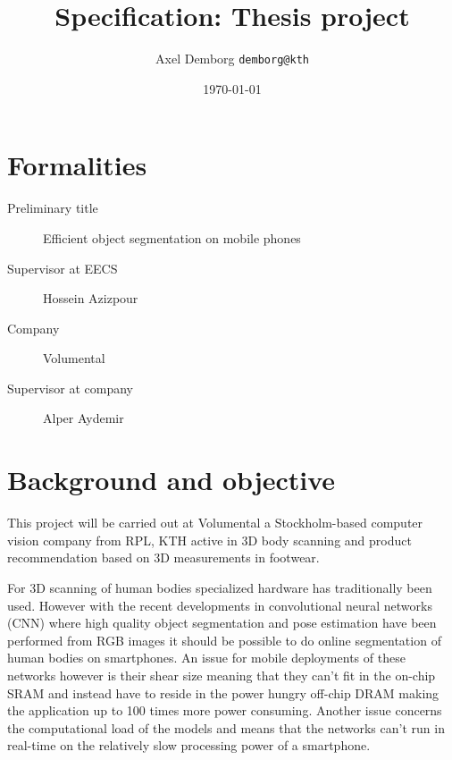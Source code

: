 \documentclass[11pt]{article}
\author{Axel Demborg \texttt{demborg@kth}}
\date{\today}
\title{Specification: Thesis project}
\newcommand{\bibentry}[1]{\cite{#1}}
\begin{document}
\maketitle

\section{Formalities}
\label{sec:orgdc45faf}
\begin{description}
\item[{Preliminary title}] Efficient object segmentation on mobile phones
\item[{Supervisor at EECS}] Hossein Azizpour
\item[{Company}] Volumental
\item[{Supervisor at company}] Alper Aydemir
\end{description}

\section{Background and objective}
\label{sec:org6671fd2}
This project will be carried out at Volumental a Stockholm-based computer vision company from RPL, KTH active in 3D body scanning and product recommendation based on 3D measurements in footwear.

For 3D scanning of human bodies specialized hardware has traditionally been used. However with the recent developments in convolutional neural networks (CNN) where high quality object segmentation\bibentry{BriefHistory} and pose estimation\bibentry{he2017mask} have been performed from RGB images it should be possible to do online segmentation of human bodies on smartphones. An issue for mobile deployments of these networks however is their shear size meaning that they can't fit in the on-chip SRAM and instead have to reside in the power hungry off-chip DRAM making the application up to 100 times more power consuming\bibentry{han2015learning}. Another issue concerns the computational load of the models and means that the networks can't run in real-time on the relatively slow processing power of a smartphone.
\end{document}
